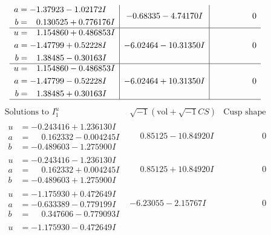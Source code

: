 \documentclass[1p]{elsarticle_modified}
\theoremstyle{definition}
\newcommand{\I}{\sqrt{-1}}
\begin{document}
$$\begin{array}{c|c|c}
\begin{aligned}
a &= -1.37923 - 1.02172 I \\
b &= \phantom{-}0.130525 + 0.776176 I\end{aligned}
 & -0.68335 - 4.74170 I & \phantom{-0.000000 } 0 \\ \hline\begin{aligned}
u &= \phantom{-}1.154860 + 0.486853 I \\
a &= -1.47799 + 0.52228 I \\
b &= \phantom{-}1.38485 - 0.30163 I\end{aligned}
 & -6.02464 - 10.31350 I & \phantom{-0.000000 } 0 \\ \hline\begin{aligned}
u &= \phantom{-}1.154860 - 0.486853 I \\
a &= -1.47799 - 0.52228 I \\
b &= \phantom{-}1.38485 + 0.30163 I\end{aligned}
 & -6.02464 + 10.31350 I & \phantom{-0.000000 } 0\\
 \hline 
 \end{array}$$\newpage$$\begin{array}{c|c|c}  
\text{Solutions to }I^u_{1}& \I (\text{vol} + \sqrt{-1}CS) & \text{Cusp shape}\\
 \hline 
\begin{aligned}
u &= -0.243416 + 1.236130 I \\
a &= \phantom{-}0.162332 - 0.004245 I \\
b &= -0.489603 - 1.275900 I\end{aligned}
 & \phantom{-}0.85125 - 10.84920 I & \phantom{-0.000000 } 0 \\ \hline\begin{aligned}
u &= -0.243416 - 1.236130 I \\
a &= \phantom{-}0.162332 + 0.004245 I \\
b &= -0.489603 + 1.275900 I\end{aligned}
 & \phantom{-}0.85125 + 10.84920 I & \phantom{-0.000000 } 0 \\ \hline\begin{aligned}
u &= -1.175930 + 0.472649 I \\
a &= -0.633389 - 0.779199 I \\
b &= \phantom{-}0.347606 - 0.779093 I\end{aligned}
 & -6.23055 - 2.15767 I & \phantom{-0.000000 } 0 \\ \hline\begin{aligned}
u &= -1.175930 - 0.472649 I \\

\end{aligned}
\end{array}$$
\end{document}
